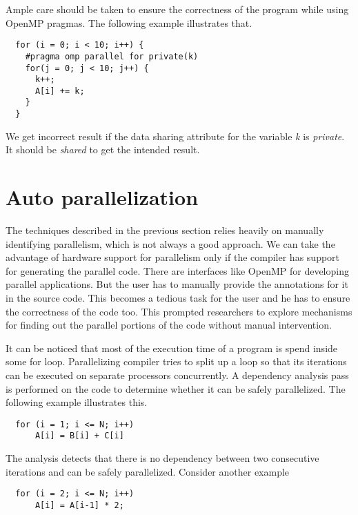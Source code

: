 Ample care should be taken to ensure the correctness of the program while using OpenMP pragmas. The following
example illustrates that.
{\footnotesize
\begin{lstlisting}
  for (i = 0; i < 10; i++) {
    #pragma omp parallel for private(k)
    for(j = 0; j < 10; j++) {
      k++;
      A[i] += k;
    }
  }
\end{lstlisting}
}

We get incorrect result if the data sharing attribute for the variable \emph{k} is \emph {private}. It should
be \emph{shared} to get the intended result.



\section{Auto parallelization}
The techniques described in the previous section relies heavily on manually
identifying parallelism, which is not always a good approach.
We can take the advantage of hardware support for parallelism only if the compiler has
support for generating the parallel code. There are interfaces like OpenMP for
developing parallel applications. But the user has to manually provide the annotations
for it in the source code. This becomes a tedious task for the user and he has to
ensure the correctness of the code too. This prompted researchers to explore
mechanisms for finding out the parallel portions of the code without manual intervention.

It can be noticed that most of the execution time of a program is spend inside some
for loop. Parallelizing compiler tries to split up a loop so that its iterations can
be executed on separate processors concurrently. A dependency analysis pass is 
performed on the code to determine whether it can be safely parallelized. The following
example illustrates this.

{\footnotesize
\begin{lstlisting}
  for (i = 1; i <= N; i++)
      A[i] = B[i] + C[i]
\end{lstlisting}
}

\noindent
The analysis detects that there is no dependency between two consecutive iterations and
can be safely parallelized. Consider another example

{\footnotesize
\begin{lstlisting}
  for (i = 2; i <= N; i++)
      A[i] = A[i-1] * 2;
\end{lstlisting}
}

